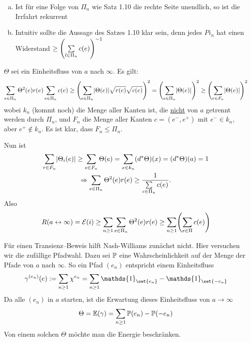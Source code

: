 \begin{bemerkung}
	\begin{enumerate}[a)]
		\item Ist für eine Folge von $\Pi_n$ wie Satz 1.10 die rechte Seite unendlich, so ist die Irrfahrt rekurrent
		\item Intuitiv sollte die Aussage des Satzes  1.10 klar sein, denn jedes $Pi_n$ hat einen Widerstand $ \geq \left(\sum\limits_{l\in \Pi_n} c(e)\right)^{-1}$
	\end{enumerate}
\end{bemerkung}
\begin{beweis}
	$\Theta$ sei ein Einheitsfluss von $a$ nach $\infty$. Es gilt:
	\begin{align}
		\sum\limits_{e \in \Pi_n} \Theta^2(e) r(e) \sum\limits_{e \in \Pi_n} c(e) \geq \left(\sum\limits_{e \in \Pi_n}\lvert\Theta(e)\rvert \sqrt{r(e)}\sqrt{c(e)}\right)^2 = \left(\sum\limits_{e \in \Pi_n}\lvert\Theta(e)\rvert\right)^2 \geq \left(\sum\limits_{e \in F_n}\lvert\Theta(e)\rvert \right)^2
	\end{align}
	wobei $k_n$ (kommt noch) die Menge aller Kanten ist, die \underline{nicht} von $a$ getrennt werden durch $\Pi_n$, und $F_n$ die Menge aller Kanten $c = (e^-,e^+)$ mit $e^- \in k_n$, aber $e^+ \notin k_n$. Es ist klar, dass $F_n \leq \Pi_n$.
	
	Nun ist 
	\begin{gather}
		\sum\limits_{r \in F_n} \lvert\Theta_i(e)\rvert \geq \sum\limits_{e \in F_n} \Theta(e) = \sum\limits_{x \in k_n} (d^*\Theta)(x) = (d^*\Theta)(a) = 1 \\
		\Rightarrow \sum\limits_{e \in \Pi_n} \Theta^2(e)r(e) \geq \frac{1}{\sum\limits_{c \in \Pi_n}c(e)}.
	\end{gather}
	Also 
	\begin{align}
		R (a \leftrightarrow \infty) = \mathcal{E}(i) \geq \sum\limits_{n \geq 1}\sum\limits_{e\in \Pi_n} \Theta^2(e)r(e) \geq \sum\limits_{n \geq 1} \enb{\sum\limits_{e \in\Pi} c(e)}
	\end{align}
	
	
\end{beweis}

Für einen Transienz--Beweis hilft Nash-Williams zunächst nicht. Hier versuchen wir die zufällige Pfadwahl. Dazu sei $\mathbb{P}$ eine Wahrscheinlichkeit auf der Menge der Pfade von $a$ nach $\infty$. So ein Pfad $(e_n)$ entspricht einem Einheitsfluss
\begin{gather}
	\gamma^{(e_n)} (e) := \sum\limits_{n \geq 1} \chi^{e_n} = \sum\limits_{n \geq 1} \mathds{1}_{\set{e_n}}- \mathds{1}_{\set{-e_n}}
\end{gather}
Da alle $(e_n)$ in $a$ starten, ist die Erwartung dieses Einheitsfluss von $a \to \infty$  
\begin{align}
	\Theta = \EW{\gamma} = \sum\limits_{n \geq 1}\prop{e_n} - \prop{-e_n}
\end{align}
Von einem solchen $\Theta$ möchte man die Energie beschränken. 

